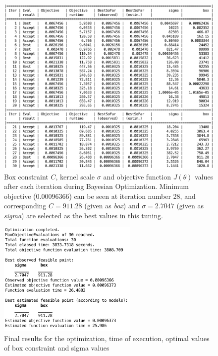 \begin{figure}
\begin{center}
\includegraphics[width=1.13\textwidth]{figures/optimizationSummaryStuckFault}    %
\caption{Box constraint $C$, kernel scale $\sigma$ and objective function $J(\theta)$ values after each iteration during Bayesian Optimization. Minimum objective ($0.00096366$) can be seen at iteration number 28, and corresponding $C = 911.28$ (given as \emph{box}) and $\sigma = 2.7047$ (given as \emph{sigma}) are selected as the best values in this tuning.} 
\label{fig:optBayesianSteps}
\end{center}
\end{figure}

\begin{figure}
\begin{center}
\includegraphics[width=0.6\textwidth]{figures/optimizationResultsStuckFault}    %
\caption{Final results for the optimization, time of execution, optimal values of box constraint and sigma values} 
\label{fig:optimBayesianResults}
\end{center}
\end{figure}

